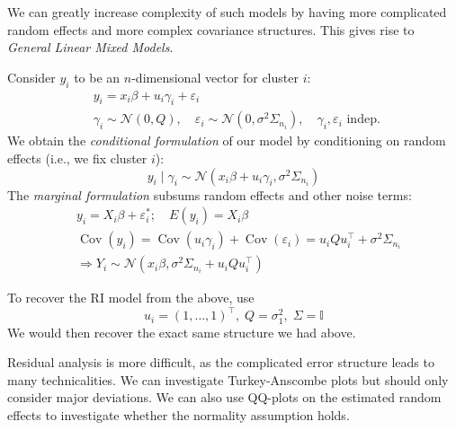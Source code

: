 \documentclass[11pt, %
	oneside, %
	english, %
	onehalfspacing, %
	]{article} %
\numberwithin{equation}{section}
\begin{document}
We can greatly increase complexity of such models by having more complicated random effects and more complex covariance structures. This gives rise to \emph{General Linear Mixed Models}.

Consider $y_i$ to be an $n$-dimensional vector for cluster $i$:
\begin{equation*}
    \begin{aligned}
        & y_i=x_i \beta+u_i \gamma_i+\varepsilon_i \\
        & \gamma_i \sim \mathcal{N}(0, Q), \quad \varepsilon_i \sim \mathcal{N}\left(0, \sigma^2 \Sigma_{n_i}\right), \quad \gamma_i, \varepsilon_i \text { indep. }
        \end{aligned}
\end{equation*}
We obtain the \emph{conditional formulation} of our model by conditioning on random effects (i.e., we fix cluster $i$):
\begin{equation*}
    y_i \mid \gamma_i \sim \mathcal{N}\left(x_i \beta+u_i \gamma_i, \sigma^2 \Sigma_{n_i}\right)
\end{equation*}
The \emph{marginal formulation} subsums random effects and other noise terms:
 \begin{equation*}
    \begin{aligned}
        & y_i=X_i \beta+\varepsilon_i^*; \quad E\left(y_i\right)=X_i \beta \\
        & \operatorname{Cov}\left(y_i\right)=\operatorname{Cov}\left(u_i \gamma_i\right)+\operatorname{Cov}\left(\varepsilon_i\right)= u_i Q u_i^{\top}+\sigma^2 \Sigma_{n_i} \\
        & \Rightarrow Y_i \sim \mathcal{N}\left(x_i \beta, \sigma^2 \Sigma_{n_i}+u_i Q u_i^{\top}\right)
    \end{aligned}
 \end{equation*}

 \begin{example}{}{}
    To recover the RI model from the above, use
	\begin{equation*}
		u_i=(1, \ldots, 1)^{\top}, \;Q=\sigma_1^2, \; \Sigma=\mathbb{I}
	\end{equation*}
     We would then recover the exact same structure we had above.
\end{example}

Residual analysis is more difficult, as the complicated error structure leads to many technicalities. We can investigate Turkey-Anscombe plots but should only consider major deviations. We can also use QQ-plots on the estimated random effects to investigate whether the normality assumption holds.
\end{document}
